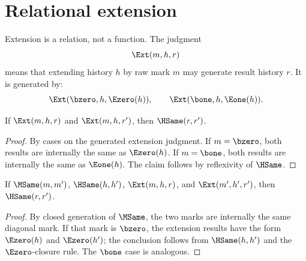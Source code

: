 \section{Relational extension}

\begin{definition}
\label{def:proof-sprint-extension-relation}
Extension is a relation, not a function.  The judgment
$$
\Ext(m,h,r)
$$
means that extending history \(h\) by raw mark \(m\) may generate result history \(r\).  It is generated by:
$$
\Ext(\bzero,h,\Ezero(h)),
\qquad
\Ext(\bone,h,\Eone(h)).
$$
\end{definition}

\begin{theorem}
If \(\Ext(m,h,r)\) and \(\Ext(m,h,r')\), then \(\HSame(r,r')\).
\end{theorem}
\begin{proof}
By cases on the generated extension judgment.  If \(m=\bzero\), both results are internally the same as \(\Ezero(h)\).  If \(m=\bone\), both results are internally the same as \(\Eone(h)\).  The claim follows by reflexivity of \(\HSame\).
\end{proof}

\begin{theorem}
If \(\MSame(m,m')\), \(\HSame(h,h')\), \(\Ext(m,h,r)\), and \(\Ext(m',h',r')\), then \(\HSame(r,r')\).
\end{theorem}
\begin{proof}
By closed generation of \(\MSame\), the two marks are internally the same diagonal mark.  If that mark is \(\bzero\), the extension results have the form \(\Ezero(h)\) and \(\Ezero(h')\); the conclusion follows from \(\HSame(h,h')\) and the \(\Ezero\)-closure rule.  The \(\bone\) case is analogous.
\end{proof}
